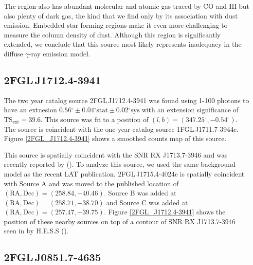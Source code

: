 \documentclass[12pt,preprint]{aastex}
\newcommand{\gev}{\text{GeV}\xspace}
\newcommand{\tev}{\text{TeV}\xspace}
\newcommand{\tsext}{{\ensuremath{\text{TS}_{\text{ext}}}}\xspace}
\newcommand{\sys}{\text{sys}\xspace}
\newcommand{\stat}{\text{stat}\xspace}
\renewcommand{\deg}{\ensuremath{^\circ}\xspace}
\begin{document}
The region also has abundant molecular and atomic gas traced by CO
and HI but also plenty of dark gas, the kind that we find only by its
association with dust emission. Embedded star-forming regions make it even
more challenging to measure the column density of dust.  Although this
region is significantly extended, we conclude that this source most
likely represents inadequacy in the diffuse $\gamma$-ray emission model.


\subsection{2FGL\,J1712.4-3941}
\label{section_2FGL_J1712.4-3941}


The two year catalog source 2FGL\,J1712.4-3941 was found using 1-100 \gev
photons to have an extnesion $0.56\deg\pm0.04\deg\stat\pm0.02\deg\sys$
with an extension significance of $\tsext=39.6$.  This source was
fit to a position of $(l,b)=(347.25\deg,-0.54\deg)$.  The source
is coincident with the one year catalog source 1FGL\,J1711.7-3944c.
Figure \ref{2FGL_J1712.4-3941} shows a smoothed counts map of this source.

This source is spatially coincident with the SNR RX J1713.7-3946 and was
recently reported by (\cite{rx_j1713_lat}).  To analyze this source,
we used the same background model as the recent LAT publication.
2FGL\,J1715.4-4024c is spatially coincident with Source A and was
moved to the published location of 
$(\text{RA},\text{Dec})=(258.84,-40.46)$. Source
B was added at 
$(\text{RA},\text{Dec})=(258.71,-38.70)$ and Source C was added at
$(\text{RA},\text{Dec})=(257.47,-39.75)$.  Figure \ref{2FGL_J1712.4-3941} shows
the position of these nearby sources on top of a contour of SNR RX
J1713.7-3946 seen in \tev by H.E.S.S (\cite{rx_j1713_hess}).

\subsection{2FGL\,J0851.7-4635}
\label{section_2FGL_J0851.7-4635}
\end{document}
